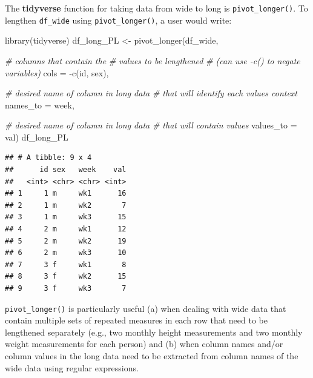 \documentclass[
]{book}
\newenvironment{Shaded}{\begin{snugshade}}{\end{snugshade}}
\newcommand{\AttributeTok}[1]{\textcolor[rgb]{0.77,0.63,0.00}{#1}}
\newcommand{\CommentTok}[1]{\textcolor[rgb]{0.56,0.35,0.01}{\textit{#1}}}
\newcommand{\FunctionTok}[1]{\textcolor[rgb]{0.00,0.00,0.00}{#1}}
\newcommand{\NormalTok}[1]{#1}
\newcommand{\OtherTok}[1]{\textcolor[rgb]{0.56,0.35,0.01}{#1}}
\newcommand{\SpecialCharTok}[1]{\textcolor[rgb]{0.00,0.00,0.00}{#1}}
\newcommand{\StringTok}[1]{\textcolor[rgb]{0.31,0.60,0.02}{#1}}
\begin{document}
The \textbf{tidyverse} function for taking data from wide to long is \texttt{pivot\_longer()}. To lengthen \texttt{df\_wide} using \texttt{pivot\_longer()}, a user would write:

\begin{Shaded}
\begin{Highlighting}[]
\FunctionTok{library}\NormalTok{(tidyverse)}
\NormalTok{df\_long\_PL }\OtherTok{\textless{}{-}} \FunctionTok{pivot\_longer}\NormalTok{(df\_wide,}
                           
                           \CommentTok{\# columns that contain the }
                           \CommentTok{\# values to be lengthened }
                           \CommentTok{\# (can use {-}c() to negate variables)}
                           \AttributeTok{cols =} \SpecialCharTok{{-}}\FunctionTok{c}\NormalTok{(}\StringTok{\textquotesingle{}id\textquotesingle{}}\NormalTok{, }\StringTok{\textquotesingle{}sex\textquotesingle{}}\NormalTok{), }
                           
                           \CommentTok{\# desired name of column in long data }
                           \CommentTok{\# that will identify each value\textquotesingle{}s context}
                           \AttributeTok{names\_to =} \StringTok{\textquotesingle{}week\textquotesingle{}}\NormalTok{,}
                           
                           \CommentTok{\# desired name of column in long data }
                           \CommentTok{\# that will contain values}
                           \AttributeTok{values\_to =} \StringTok{\textquotesingle{}val\textquotesingle{}}\NormalTok{) }
\NormalTok{df\_long\_PL}
\end{Highlighting}
\end{Shaded}

\begin{verbatim}
## # A tibble: 9 x 4
##      id sex   week    val
##   <int> <chr> <chr> <int>
## 1     1 m     wk1      16
## 2     1 m     wk2       7
## 3     1 m     wk3      15
## 4     2 m     wk1      12
## 5     2 m     wk2      19
## 6     2 m     wk3      10
## 7     3 f     wk1       8
## 8     3 f     wk2      15
## 9     3 f     wk3       7
\end{verbatim}

\texttt{pivot\_longer()} is particularly useful (a) when dealing with wide data that contain multiple sets of repeated measures in each row that need to be lengthened separately (e.g., two monthly height measurements and two monthly weight measurements for each person) and (b) when column names and/or column values in the long data need to be extracted from column names of the wide data using regular expressions.
\end{document}
